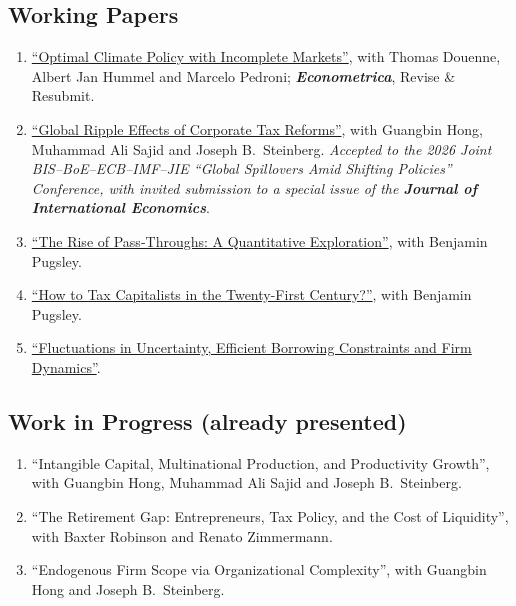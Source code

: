 \documentclass[letterpaper]{article}
\begin{document}
\subsection*{Working Papers}
\begin{enumerate}[resume]
\item \href{https://dyrda.info/files/DDHP_draft.pdf?v=1769454802}{``Optimal Climate Policy with Incomplete Markets''}, with Thomas Douenne, Albert Jan Hummel and Marcelo Pedroni; \textit{\textbf{Econometrica}}, Revise \& Resubmit.
\item \href{https://dyrda.info/files/DHSS_Global.pdf?v=1768237401}{``Global Ripple Effects of Corporate Tax Reforms''}, with Guangbin Hong, Muhammad Ali Sajid and Joseph B.\ Steinberg. \textit{Accepted to the 2026 Joint BIS--BoE--ECB--IMF--JIE ``Global Spillovers Amid Shifting Policies'' Conference, with invited submission to a special issue of the \textbf{Journal of International Economics}}.
\item \href{https://dyrda.info/files/Dyrda_Pugsley_buslfo.pdf}{``The Rise of Pass-Throughs: A Quantitative Exploration''}, with Benjamin Pugsley.
\item \href{https://dyrda.info/files/Dyrda_Pugsley_optimaltax.pdf}{``How to Tax Capitalists in the Twenty-First Century?''}, with Benjamin Pugsley.
\item \href{https://dyrda.info/files/Dyrda_flucunc_paper.pdf}{``Fluctuations in Uncertainty, Efficient Borrowing Constraints and Firm Dynamics''}.
\end{enumerate}

\subsection*{Work in Progress (already presented)}
\begin{enumerate}[resume]
\item ``Intangible Capital, Multinational Production, and Productivity Growth'', with Guangbin Hong, Muhammad Ali Sajid and Joseph B.\ Steinberg.
\item ``The Retirement Gap: Entrepreneurs, Tax Policy, and the Cost of Liquidity'', with Baxter Robinson and Renato Zimmermann.
\item ``Endogenous Firm Scope via Organizational Complexity'', with Guangbin Hong and Joseph B.\ Steinberg.
\end{enumerate}
\end{document}
